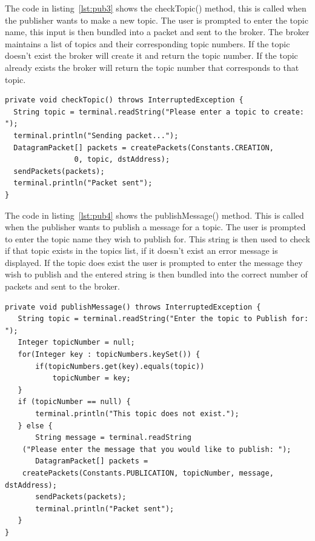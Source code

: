 \documentclass{article}
\begin{document}
The code in listing~\ref{lst:pub3} shows the checkTopic() method, this is called when the publisher wants to make a new topic. The user is prompted to enter the topic name, this input is then bundled into a packet and sent to the broker. The broker maintains a list of topics and their corresponding topic numbers. If the topic doesn't exist the broker will create it and return the topic number. If the topic already exists the broker will return the topic number that corresponds to that topic.

\begin{lstlisting}[caption={[Sample Code 2]checkTopic() gets called when the publisher wishes to create a new topic}, label={lst:pub3}]
private void checkTopic() throws InterruptedException {
  String topic = terminal.readString("Please enter a topic to create: ");
  terminal.println("Sending packet...");
  DatagramPacket[] packets = createPackets(Constants.CREATION, 
				0, topic, dstAddress);
  sendPackets(packets);
  terminal.println("Packet sent");
}
\end{lstlisting}

The code in listing~\ref{lst:pub4} shows the publishMessage() method. This is called when the publisher wants to publish a message for a topic. The user is prompted to enter the topic name they wish to publish for. This string is then used to check if that topic exists in the topics list, if it doesn't exist an error message is displayed. If the topic does exist the user is prompted to enter the message they wish to publish and the entered string is then bundled into the correct number of packets and sent to the broker.

\begin{lstlisting}[caption={[Sample Code 2]publishMessage() method, Handles user input and message publication}, label={lst:pub4}]
private void publishMessage() throws InterruptedException {
   String topic = terminal.readString("Enter the topic to Publish for: ");
   Integer topicNumber = null;
   for(Integer key : topicNumbers.keySet()) {
	   if(topicNumbers.get(key).equals(topic))
		   topicNumber = key;
   }
   if (topicNumber == null) {
	   terminal.println("This topic does not exist.");
   } else {
	   String message = terminal.readString
	("Please enter the message that you would like to publish: ");
	   DatagramPacket[] packets = 
	createPackets(Constants.PUBLICATION, topicNumber, message, dstAddress);
	   sendPackets(packets);
	   terminal.println("Packet sent");
   }
}
\end{lstlisting}
\end{document}
